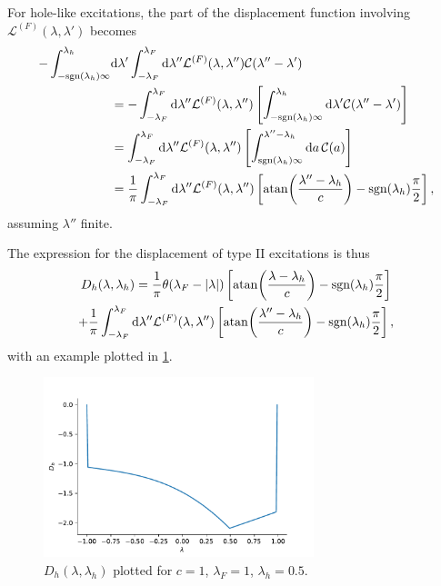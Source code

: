 \documentclass[11pt, a4paper]{report} %
\begin{document}
For hole-like excitations, the part of the displacement function involving \(\mathcal{L}^{(F)}(\lambda,\lambda')\) becomes
\begin{align}
	 - \int_{-\textrm{sgn}(\lambda_h)\infty}^{\lambda_h} &\dd \lambda' \int_{-\lambda_F}^{\lambda_F} \dd \lambda''  \mathcal{L}^{(F)}(\lambda,\lambda'') \mathcal{C}(\lambda''-\lambda')\\
	 &= - \int_{-\lambda_F}^{\lambda_F} \dd \lambda''  \mathcal{L}^{(F)}(\lambda,\lambda'')\left[ \int_{-\textrm{sgn}(\lambda_h)\infty}^{\lambda_h} \dd \lambda' \mathcal{C}(\lambda''-\lambda')\right]\\
	 &= \int_{-\lambda_F}^{\lambda_F} \dd \lambda''  \mathcal{L}^{(F)}(\lambda,\lambda'')\left[ \int_{\textrm{sgn}(\lambda_h)\infty}^{\lambda''-\lambda_h} \dd a \, \mathcal{C}(a)\right]\\
	 &= \frac{1}{\pi}\int_{-\lambda_F}^{\lambda_F} \dd  \lambda''  \mathcal{L}^{(F)}(\lambda,\lambda'')\left[ \atan(\frac{\lambda''-\lambda_h}{c}) - \textrm{sgn}(\lambda_h)\frac{\pi}{2}\right],
\end{align}
assuming \(\lambda''\) finite.

The expression for the displacement of type II excitations is thus
\begin{multline}
	D_h(\lambda, \lambda_h) = \frac{1}{\pi}\theta(\lambda_F - \abs{\lambda}) \left[ \atan(\frac{\lambda-\lambda_h}{c}) - \textrm{sgn}(\lambda_h)\frac{\pi}{2}\right] \\+
	\frac{1}{\pi}\int_{-\lambda_F}^{\lambda_F} \dd  \lambda''  \mathcal{L}^{(F)}(\lambda,\lambda'')\left[ \atan(\frac{\lambda''-\lambda_h}{c}) - \textrm{sgn}(\lambda_h)\frac{\pi}{2}\right],
\end{multline}
with an example plotted in \cref{fig:dhplot}.
\begin{figure}[tb!]
  \centering
  \includegraphics[width=0.7\textwidth]{dhplot.pdf}
  \caption{$D_h(\lambda,\lambda_h)$ plotted for \(c=1\), \(\lambda_F=1\), \(\lambda_h=0.5\).}
  \label{fig:dhplot}
\end{figure}
\end{document}
